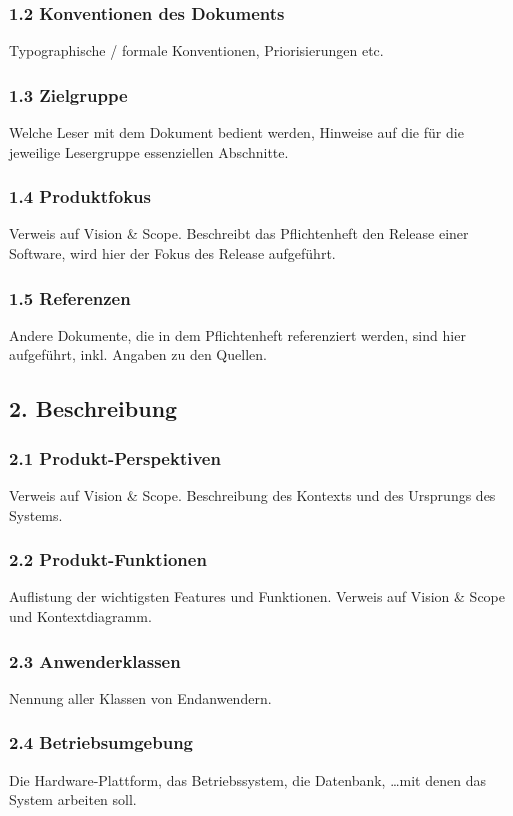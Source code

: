\subsubsection*{1.2 Konventionen des Dokuments}
Typographische / formale Konventionen, Priorisierungen etc.

\subsubsection*{1.3 Zielgruppe}
Welche Leser mit dem Dokument bedient werden, Hinweise auf die für die jeweilige Lesergruppe essenziellen Abschnitte.

\subsubsection*{1.4 Produktfokus}
Verweis auf Vision \& Scope. Beschreibt das Pflichtenheft den Release einer Software, wird hier der Fokus des Release aufgeführt.

\subsubsection*{1.5 Referenzen}
Andere Dokumente, die in dem Pflichtenheft referenziert werden, sind hier aufgeführt, inkl. Angaben zu den Quellen.


\subsection*{2. Beschreibung}


\subsubsection*{2.1 Produkt-Perspektiven}
Verweis auf Vision \& Scope. Beschreibung des Kontexts und des Ursprungs des Systems.

\subsubsection*{2.2 Produkt-Funktionen}
Auflistung der wichtigsten Features und Funktionen. Verweis auf Vision \& Scope und Kontextdiagramm.

\subsubsection*{2.3 Anwenderklassen}
Nennung aller Klassen von Endanwendern.

\subsubsection*{2.4 Betriebsumgebung}
Die Hardware-Plattform, das Betriebssystem, die Datenbank, \ldots mit denen das System arbeiten soll.

